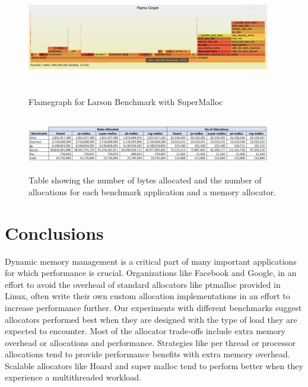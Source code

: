 \documentclass[sigplan,screen]{acmart}
\begin{document}


\begin{figure}
\centering
\includegraphics[width=0.95\textwidth, height=5.0cm]{flamegraph.png}
\caption{Flamegraph for Larson Benchmark with SuperMalloc}
\label{flame}
\end{figure}

\begin{figure}
\centering
\includegraphics[width=0.95\textwidth, height=2.5cm]{table-memory.png}
\caption{Table showing the number of bytes allocated and the number of allocations for each benchmark application and a memory allocator.}
\label{memtable}
\end{figure}

\section{Conclusions}
Dynamic memory management is a critical part of many important applications for which performance is crucial. Organizations like Facebook and Google,  in an effort to avoid the overhead of standard allocators like ptmalloc provided in Linux, often write their own custom allocation implementations in an effort to increase performance further. Our experiments with different benchmarks suggest allocators performed best when they are designed with the type of load they are expected to encounter.  Most of the allocator trade-offs include extra memory overhead or allocations and performance. Strategies like per thread  or processor allocations tend to provide performance benefits with extra memory overhead. Scalable allocators like Hoard and super malloc tend to perform better when they experience a multithreaded workload. 
\end{document}
